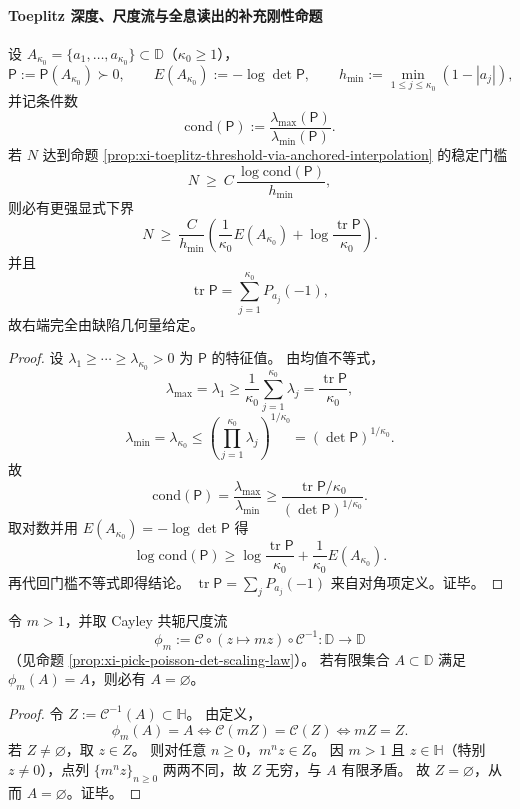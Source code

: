 \paragraph{Toeplitz 深度、尺度流与全息读出的补充刚性命题}

\begin{theorem}\label{thm:xi-toeplitz-depth-hard-lower-bound-defect-entropy}
设 \(A_{\kappa_0}=\{a_1,\dots,a_{\kappa_0}\}\subset\mathbb D\)（\(\kappa_0\ge 1\)），
\[
\mathsf P:=\mathsf P(A_{\kappa_0})\succ0,\qquad
E(A_{\kappa_0}):=-\log\det\mathsf P,\qquad
h_{\min}:=\min_{1\le j\le \kappa_0}(1-|a_j|),
\]
并记条件数
\[
\mathrm{cond}(\mathsf P):=\frac{\lambda_{\max}(\mathsf P)}{\lambda_{\min}(\mathsf P)}.
\]
若 \(N\) 达到命题 \ref{prop:xi-toeplitz-threshold-via-anchored-interpolation} 的稳定门槛
\[
N\ \ge\ C\,\frac{\log \mathrm{cond}(\mathsf P)}{h_{\min}},
\]
则必有更强显式下界
\[
N\ \ge\ \frac{C}{h_{\min}}
\left(
\frac{1}{\kappa_0}E(A_{\kappa_0})
+\log\frac{\operatorname{tr}\mathsf P}{\kappa_0}
\right).
\]
并且
\[
\operatorname{tr}\mathsf P=\sum_{j=1}^{\kappa_0}P_{a_j}(-1),
\]
故右端完全由缺陷几何量给定。
\end{theorem}
\begin{proof}
设 \(\lambda_1\ge\cdots\ge\lambda_{\kappa_0}>0\) 为 \(\mathsf P\) 的特征值。
由均值不等式，
\[
\lambda_{\max}=\lambda_1\ge \frac{1}{\kappa_0}\sum_{j=1}^{\kappa_0}\lambda_j
=\frac{\operatorname{tr}\mathsf P}{\kappa_0},
\]
\[
\lambda_{\min}=\lambda_{\kappa_0}\le
\left(\prod_{j=1}^{\kappa_0}\lambda_j\right)^{1/\kappa_0}
=(\det\mathsf P)^{1/\kappa_0}.
\]
故
\[
\mathrm{cond}(\mathsf P)
=\frac{\lambda_{\max}}{\lambda_{\min}}
\ge
\frac{\operatorname{tr}\mathsf P/\kappa_0}{(\det\mathsf P)^{1/\kappa_0}}.
\]
取对数并用 \(E(A_{\kappa_0})=-\log\det\mathsf P\) 得
\[
\log\mathrm{cond}(\mathsf P)\ge
\log\frac{\operatorname{tr}\mathsf P}{\kappa_0}
+\frac{1}{\kappa_0}E(A_{\kappa_0}).
\]
再代回门槛不等式即得结论。
\(\operatorname{tr}\mathsf P=\sum_j P_{a_j}(-1)\) 来自对角项定义。证毕。
\end{proof}

\begin{theorem}[尺度流下有限内点缺陷不变集的不可能性]\label{thm:xi-cayley-scaling-no-finite-interior-invariant-set}
令 \(m>1\)，并取 Cayley 共轭尺度流
\[
\phi_m:=\mathcal C\circ(z\mapsto mz)\circ\mathcal C^{-1}:\mathbb D\to\mathbb D
\]
（见命题 \ref{prop:xi-pick-poisson-det-scaling-law}）。
若有限集合 \(A\subset\mathbb D\) 满足 \(\phi_m(A)=A\)，则必有 \(A=\varnothing\)。
\end{theorem}
\begin{proof}
令 \(Z:=\mathcal C^{-1}(A)\subset\mathbb H\)。
由定义，
\[
\phi_m(A)=A
\iff
\mathcal C(mZ)=\mathcal C(Z)
\iff
mZ=Z.
\]
若 \(Z\neq\varnothing\)，取 \(z\in Z\)。
则对任意 \(n\ge 0\)，\(m^n z\in Z\)。
因 \(m>1\) 且 \(z\in\mathbb H\)（特别 \(z\neq 0\)），点列 \(\{m^n z\}_{n\ge 0}\) 两两不同，故 \(Z\) 无穷，与 \(A\) 有限矛盾。
故 \(Z=\varnothing\)，从而 \(A=\varnothing\)。证毕。
\end{proof}

